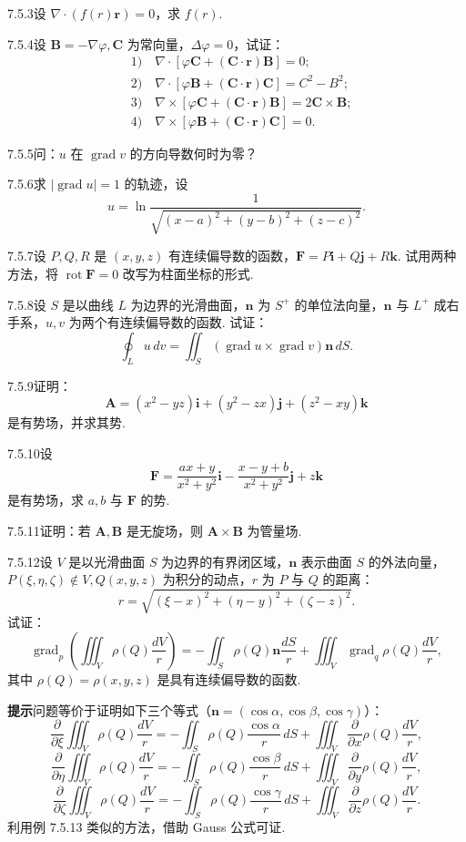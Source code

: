 \documentclass[UTF8,12pt,a4paper,fontset=fandol]{ctexart}
\begin{document}
7.5.3\quad 设 $\nabla\cdot(f(r)\mathbf r)=0$，求 $f(r)$.

7.5.4\quad 设 $\mathbf B=-\nabla\varphi,\mathbf C$ 为常向量，$\Delta\varphi=0$，试证：
\[
\begin{aligned}
&1)\quad \nabla\cdot[\varphi\mathbf C+(\mathbf C\cdot\mathbf r)\mathbf B]=0;\\
&2)\quad \nabla\cdot[\varphi\mathbf B+(\mathbf C\cdot\mathbf r)\mathbf C]=C^2-B^2;\\
&3)\quad \nabla\times[\varphi\mathbf C+(\mathbf C\cdot\mathbf r)\mathbf B]=2\mathbf C\times\mathbf B;\\
&4)\quad \nabla\times[\varphi\mathbf B+(\mathbf C\cdot\mathbf r)\mathbf C]=0.
\end{aligned}
\]

7.5.5\quad 问：$u$ 在 $\operatorname{grad}v$ 的方向导数何时为零？

7.5.6\quad 求 $|\operatorname{grad}u|=1$ 的轨迹，设
\[
u=\ln\frac1{\sqrt{(x-a)^2+(y-b)^2+(z-c)^2}}.
\]

7.5.7\quad 设 $P,Q,R$ 是 $(x,y,z)$ 有连续偏导数的函数，$\mathbf F=P\mathbf i+Q\mathbf j+R\mathbf k$. 试用两种方法，将 $\operatorname{rot}\mathbf F=0$ 改写为柱面坐标的形式.

7.5.8\quad 设 $S$ 是以曲线 $L$ 为边界的光滑曲面，$\mathbf n$ 为 $S^+$ 的单位法向量，$\mathbf n$ 与 $L^+$ 成右手系，$u,v$ 为两个有连续偏导数的函数. 试证：
\[
\oint_Lu\,dv=\iint_S(\operatorname{grad}u\times\operatorname{grad}v)\mathbf n\,dS.
\]

7.5.9\quad 证明：
\[
\mathbf A=(x^2-yz)\mathbf i+(y^2-zx)\mathbf j+(z^2-xy)\mathbf k
\]
是有势场，并求其势.

7.5.10\quad 设
\[
\mathbf F=\frac{ax+y}{x^2+y^2}\mathbf i-\frac{x-y+b}{x^2+y^2}\mathbf j+z\mathbf k
\]
是有势场，求 $a,b$ 与 $\mathbf F$ 的势.

7.5.11\quad 证明：若 $\mathbf A,\mathbf B$ 是无旋场，则 $\mathbf A\times\mathbf B$ 为管量场.

7.5.12\quad 设 $V$ 是以光滑曲面 $S$ 为边界的有界闭区域，$\mathbf n$ 表示曲面 $S$ 的外法向量，$P(\xi,\eta,\zeta)\notin V,Q(x,y,z)$ 为积分的动点，$r$ 为 $P$ 与 $Q$ 的距离：
\[
r=\sqrt{(\xi-x)^2+(\eta-y)^2+(\zeta-z)^2}.
\]
试证：
\[
\operatorname{grad}_p\left(\iiint_V\rho(Q)\frac{dV}{r}\right)
=-\iint_S\rho(Q)\mathbf n\frac{dS}{r}
+\iiint_V\operatorname{grad}_q\rho(Q)\frac{dV}{r},
\]
其中 $\rho(Q)=\rho(x,y,z)$ 是具有连续偏导数的函数.

\noindent\textbf{提示}\quad 问题等价于证明如下三个等式（$\mathbf n=(\cos\alpha,\cos\beta,\cos\gamma)$）：
\[
\frac{\partial}{\partial\xi}\iiint_V\rho(Q)\frac{dV}{r}
=-\iint_S\rho(Q)\frac{\cos\alpha}{r}\,dS+\iiint_V\frac{\partial}{\partial x}\rho(Q)\frac{dV}{r},
\]
\[
\frac{\partial}{\partial\eta}\iiint_V\rho(Q)\frac{dV}{r}
=-\iint_S\rho(Q)\frac{\cos\beta}{r}\,dS+\iiint_V\frac{\partial}{\partial y}\rho(Q)\frac{dV}{r},
\]
\[
\frac{\partial}{\partial\zeta}\iiint_V\rho(Q)\frac{dV}{r}
=-\iint_S\rho(Q)\frac{\cos\gamma}{r}\,dS+\iiint_V\frac{\partial}{\partial z}\rho(Q)\frac{dV}{r}.
\]
利用例 7.5.13 类似的方法，借助 Gauss 公式可证.
\end{document}
